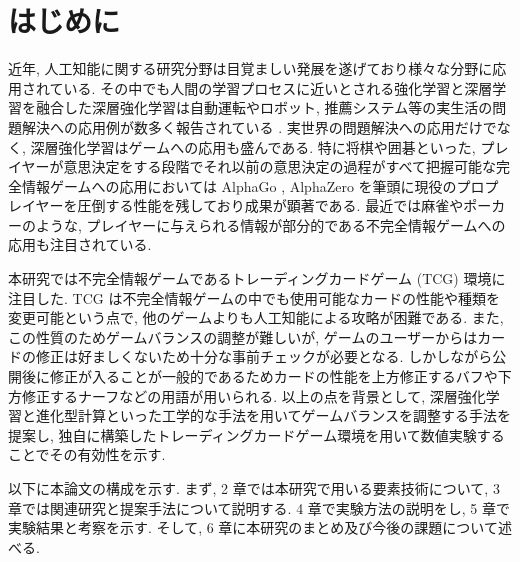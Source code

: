 \newpage
\changeindent{0cm}
\section{はじめに}
\changeindent{2cm}

近年, 人工知能に関する研究分野は目覚ましい発展を遂げており様々な分野に応用されている. その中でも人間の学習プロセスに近いとされる強化学習と深層学習を融合した深層強化学習は自動運転やロボット, 推薦システム等の実生活の問題解決への応用例が数多く報告されている \cite{Vehicle}\cite{robotics}\cite{recommendation}. 
実世界の問題解決への応用だけでなく, 深層強化学習はゲームへの応用も盛んである.
特に将棋や囲碁といった, プレイヤーが意思決定をする段階でそれ以前の意思決定の過程がすべて把握可能な完全情報ゲームへの応用においては AlphaGo \cite{AlphaGo}, AlphaZero \cite{AlphaZero} を筆頭に現役のプロプレイヤーを圧倒する性能を残しており成果が顕著である. 
最近では麻雀やポーカーのような, プレイヤーに与えられる情報が部分的である不完全情報ゲームへの応用も注目されている.
\par
本研究では不完全情報ゲームであるトレーディングカードゲーム (TCG) 環境に注目した. TCG は不完全情報ゲームの中でも使用可能なカードの性能や種類を変更可能という点で, 他のゲームよりも人工知能による攻略が困難である. また, この性質のためゲームバランスの調整が難しいが, ゲームのユーザーからはカードの修正は好ましくないため十分な事前チェックが必要となる. しかしながら公開後に修正が入ることが一般的であるためカードの性能を上方修正するバフや下方修正するナーフなどの用語が用いられる. 以上の点を背景として, 深層強化学習と進化型計算といった工学的な手法を用いてゲームバランスを調整する手法を提案し, 独自に構築したトレーディングカードゲーム環境を用いて数値実験することでその有効性を示す. 
\par
以下に本論文の構成を示す.  まず, 2 章では本研究で用いる要素技術について, 3 章では関連研究と提案手法について説明する. 4 章で実験方法の説明をし, 5 章で実験結果と考察を示す. そして, 6 章に本研究のまとめ及び今後の課題について述べる.
